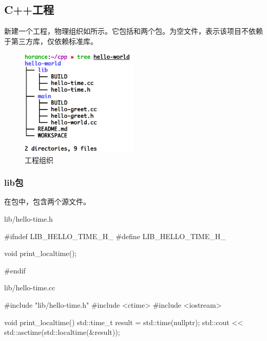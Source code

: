 \begin{content}

\subsection{C++工程}

新建一个工程，物理组织如所示。它包括和两个包。为空文件，表示该项目不依赖于第三方库，仅依赖标准库。

\begin{figure}[H]
\centering
\includegraphics[width=0.5\textwidth]{figures/bazel-tour-hello-world-tree.png}
\caption{工程组织} 
 \label{fig:bazel-tour-hello-world-tree}
\end{figure}

\subsubsection{lib包}

在包中，包含两个源文件。

\begin{nodiff}{lib/hello-time.h}
 \begin{c++}
#ifndef LIB_HELLO_TIME_H_      
#define LIB_HELLO_TIME_H_

void print_localtime();

#endif
 \end{c++}
\end{nodiff}

\begin{nodiff}{lib/hello-time.cc}
 \begin{c++}
#include "lib/hello-time.h"
#include <ctime>         
#include <iostream>

void print_localtime() {
  std::time_t result = std::time(nullptr);
  std::cout << std::asctime(std::localtime(&result));
}
 \end{c++}
\end{nodiff}


\end{content}
